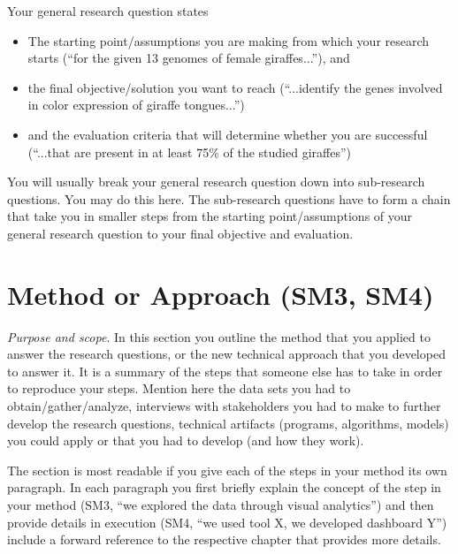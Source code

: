 Your general research question states
\begin{itemize}
  \item The starting point/assumptions you are making from which your research starts (``for the given 13 genomes of female giraffes...''), and
  \item the final objective/solution you want to reach (``...identify the genes involved in color expression of giraffe tongues...'')
  \item and the evaluation criteria that will determine whether you are successful (``...that are present in at least 75\% of the studied giraffes'')
\end{itemize}

You will usually break your general research question down into sub-research questions.
You may do this here.
The sub-research questions have to form a chain that take you in smaller steps from the starting point/assumptions of your general research question to your final objective and evaluation.

\section{Method or Approach (SM3, SM4)}\label{sec:introduction:method}

\emph{Purpose and scope}.
In this section you outline the method that you applied to answer the research questions, or the new technical approach that you developed to answer it.
It is a summary of the steps that someone else has to take in order to reproduce your steps.
Mention here the data sets you had to obtain/gather/analyze, interviews with stakeholders you had to make to further develop the research questions, technical artifacts (programs, algorithms, models) you could apply or that you had to develop (and how they work).

The section is most readable if you give each of the steps in your method its own paragraph.
In each paragraph you first briefly explain the concept of the step in your method (SM3, ``we explored the data through visual analytics'') and then provide details in execution (SM4, ``we used tool X, we developed dashboard Y'') include a forward reference to the respective chapter that provides more details.

